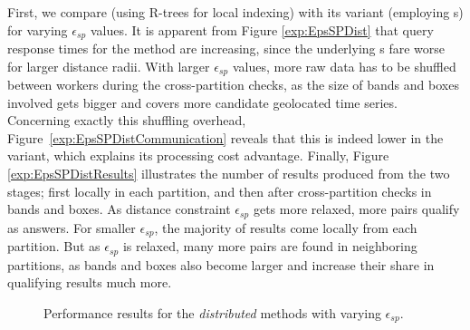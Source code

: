 First, we compare \base (using R-trees for local indexing) with its \opt variant (employing {\btsr}s) for varying $\epsilon_{sp}$ values. It is apparent from Figure \ref{exp:EpsSPDist} that query response times for the \base method are increasing, since the underlying {\rtree}s fare worse for larger distance radii. With larger $\epsilon_{sp}$ values, more raw data has to be shuffled between workers during the cross-partition checks, as the size of bands and boxes involved gets bigger and covers more candidate geolocated time series. Concerning exactly this shuffling overhead, Figure~\ref{exp:EpsSPDistCommunication} reveals that this is indeed lower in the \opt variant, which explains its processing cost advantage. Finally, Figure \ref{exp:EpsSPDistResults} illustrates the number of results produced from the two stages; first locally in each partition, and then after cross-partition checks in bands and boxes. As distance constraint $\epsilon_{sp}$ gets more relaxed, more pairs qualify as answers. For smaller $\epsilon_{sp}$, the majority of results come locally from each partition. But as $\epsilon_{sp}$ is relaxed, many more pairs are found in neighboring partitions, as bands and boxes also become larger and increase their share in qualifying results much more.

\begin{figure}[!ht]
 \centering
 \caption{Performance results for the {\em distributed} methods with varying $\epsilon_{sp}$.}
 \label{exp:distr_EpsSP}
\end{figure}

